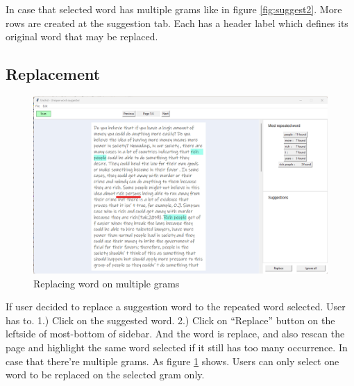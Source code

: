\documentclass[12pt,oneside,openright,a4paper]{cpe-english-project}
\begin{document}
	In case that selected word has multiple grams like in figure \ref{fig:suggest2}. More rows are created at the suggestion tab. Each has a header label which defines its original word that may be replaced. 


\subsection{Replacement}
\begin{figure}[!h]\centering
\includegraphics[width=15cm]{./img/chp4/ReplaceMul.png}
\caption{Replacing word on multiple grams}\label{fig:replace}
\end{figure}
If user decided to replace a suggestion word to the repeated word selected. User has to. 1.) Click on the suggested word. 2.) Click on “Replace” button on the leftside of most-bottom of sidebar. And the word is replace, and also rescan the page and highlight the same word selected if it still has too many occurrence. In case that there’re multiple grams. As figure \ref{fig:replace} shows. Users can only select one word to be replaced on the selected gram only.
\end{document}
